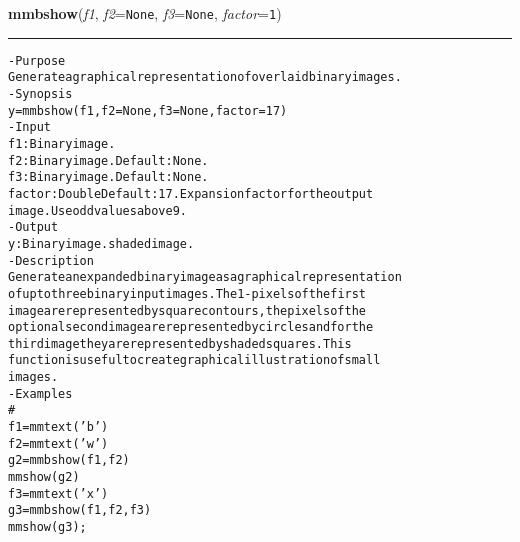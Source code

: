     \label{multireg:num_pymorph:mmbshow}
    \vspace{0.5ex}

    \begin{boxedminipage}{\textwidth}

    \raggedright \textbf{mmbshow}(\textit{f1}, \textit{f2}=\texttt{N\-o\-n\-e\-}, \textit{f3}=\texttt{N\-o\-n\-e\-}, \textit{factor}=\texttt{1\-})

    \vspace{-1.5ex}

    \rule{\textwidth}{0.5\fboxrule}
\begin{alltt}
- Purpose
    Generate a graphical representation of overlaid binary images.
- Synopsis
    y = mmbshow(f1, f2=None, f3=None, factor=17)
- Input
    f1:     Binary image.
    f2:     Binary image. Default: None.
    f3:     Binary image. Default: None.
    factor: Double Default: 17. Expansion factor for the output
            image. Use odd values above 9.
- Output
    y: Binary image. shaded image.
- Description
    Generate an expanded binary image as a graphical representation
    of up to three binary input images. The 1-pixels of the first
    image are represented by square contours, the pixels of the
    optional second image are represented by circles and for the
    third image they are represented by shaded squares. This
    function is useful to create graphical illustration of small
    images.
- Examples
    \#
    f1=mmtext('b')
    f2=mmtext('w')
    g2=mmbshow(f1,f2)
    mmshow(g2)
    f3=mmtext('x')
    g3=mmbshow(f1,f2,f3)
    mmshow(g3);\end{alltt}

    \vspace{1ex}

    \end{boxedminipage}

    \label{multireg:num_pymorph:mmcbisector}
    \vspace{0.5ex}

